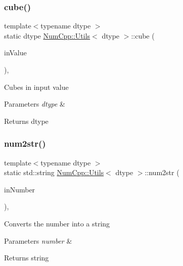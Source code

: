\subsubsection{\texorpdfstring{cube()}{cube()}}
{\footnotesize\ttfamily template$<$typename dtype $>$ \\
static dtype \mbox{\hyperlink{class_num_cpp_1_1_utils}{Num\+Cpp\+::\+Utils}}$<$ dtype $>$\+::cube (\begin{DoxyParamCaption}\item[{dtype}]{in\+Value }\end{DoxyParamCaption})\hspace{0.3cm}{\ttfamily [inline]}, {\ttfamily [static]}}

Cubes in input value


\begin{DoxyParams}{Parameters}
{\em dtype} & \\
\hline
\end{DoxyParams}
\begin{DoxyReturn}{Returns}
dtype 
\end{DoxyReturn}
\mbox{\label{class_num_cpp_1_1_utils_a74264d0d7d8c54c77bb8d7a75a7f0062}} 
\subsubsection{\texorpdfstring{num2str()}{num2str()}}
{\footnotesize\ttfamily template$<$typename dtype $>$ \\
static std\+::string \mbox{\hyperlink{class_num_cpp_1_1_utils}{Num\+Cpp\+::\+Utils}}$<$ dtype $>$\+::num2str (\begin{DoxyParamCaption}\item[{dtype}]{in\+Number }\end{DoxyParamCaption})\hspace{0.3cm}{\ttfamily [inline]}, {\ttfamily [static]}}

Converts the number into a string


\begin{DoxyParams}{Parameters}
{\em number} & \\
\hline
\end{DoxyParams}
\begin{DoxyReturn}{Returns}
string 
\end{DoxyReturn}
\mbox{\label{class_num_cpp_1_1_utils_a3cf3be763f2bf8c2025bdc39cc81e9c0}} 
